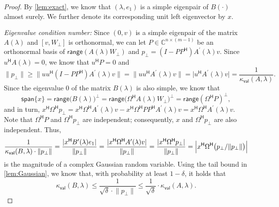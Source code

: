 \documentclass[10pt,a4paper]{amsart}
\providecommand{\Bigabs}[1]{\Bigl\lvert#1\Bigr\rvert}
\newcommand{\C}{\mathbb{C}}
\newcommand{\Htran}{\mathsf{H}}
\providecommand{\abs}[1]{\lvert#1\rvert}
\newcommand{\kval}{\kappa_{\mathsf{val}}}
\providecommand{\norm}[1]{\lVert#1\rVert}
\newcommand{\range}{\mathsf{range}}
\providecommand{\spa}[1]{\mathsf{span}\{#1\}}
\begin{document}
\begin{proof}
    By \cref{lem:exact}, we know that $(\lambda,e_{1})$ is a simple eigenpair of $B(\cdot)$ almost surely. We further denote its corresponding unit left eigenvector by $x$.
    
    \emph{Eigenvalue condition number:}
    Since $(0,v)$ is a simple eigenpair of the matrix $A(\lambda)$ and $[v,W_{\perp}]$ is orthonormal, we can let $P\in\C^{n\times (m-1)}$ be an orthonormal basis of $\range(A(\lambda)W_{\perp})$ and $p_{\perp} = (I-PP^{\Htran})A^{\prime}(\lambda)v$. Since $u^{\Htran}A(\lambda)=0$, we know that $u^{\Htran}P=0$ and 
    \begin{equation*}
        \norm{p_{\perp}} \geq \norm{uu^{\Htran}(I-PP^{\Htran})A^{\prime}(\lambda)v}= \norm{uu^{\Htran}A^{\prime}(\lambda)v} =  \abs{u^{\Htran}A^{\prime}(\lambda)v} = \frac{1}{\kval(A,\lambda)}.
    \end{equation*}
    Since the eigenvalue $0$ of the matrix $B(\lambda)$ is also simple, we know that  
    \begin{equation*}
        \spa{x} = \range\bigl(B(\lambda)\bigr)^{\perp}=\range\bigl(\Omega^{\Htran}A(\lambda)W_{\perp}\bigr)^{\perp}=\range(\Omega^{\Htran}P)^{\perp},    
    \end{equation*}
    and in turn, $x^{\Htran}\Omega^{\Htran} p_{\perp} = x^{\Htran}\Omega^{\Htran} A^{\prime}(\lambda)v-x^{\Htran}\Omega^{\Htran} PP^{\Htran}A^{\prime}(\lambda)v = x^{\Htran}\Omega^{\Htran} A^{\prime}(\lambda)v$.
    Note that $\Omega^{\Htran}P$ and $\Omega^{\Htran}p_{\perp}$ are independent; consequently, $x$ and $\Omega^{\Htran}p_{\perp}$ are also independent. Thus, 
    \begin{equation*}
        \frac{1}{\kval(B,\lambda)\cdot\norm{p_{\perp}}} = \frac{\abs{x^{\Htran}B^{\prime}(\lambda)e_{1}}}{\norm{p_{\perp}}} = \frac{\abs{x^{\Htran}\Omega^{\Htran}A^{\prime}(\lambda)v}}{\norm{p_{\perp}}} = \frac{\abs{x^{\Htran}\Omega^{\Htran}p_{\perp}}}{\norm{p_{\perp}}} = \Bigabs{x^{\Htran}\Omega^{\Htran}\bigl(p_{\perp}/\norm{p_{\perp}}\bigr)}
    \end{equation*}
    is the magnitude of a complex Gaussian random variable. Using the tail bound in \cref{lem:Gaussian}, we know that, with probability at least $1-\delta$, it holds that 
    \begin{equation*}
        \kval(B,\lambda)\leq  \frac{1}{\sqrt{\delta}\cdot\norm{p_{\perp}}}  \leq \frac{1}{\sqrt{\delta}}\cdot\kval(A,\lambda).
    \end{equation*}


\end{proof}
\end{document}

